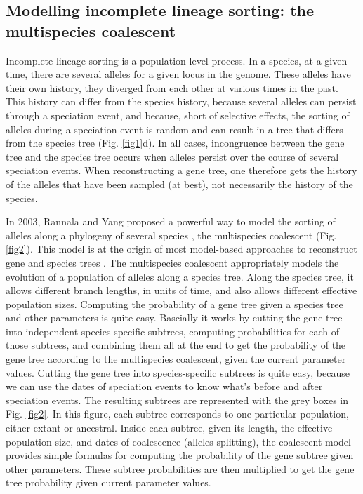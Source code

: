 \documentclass[11pt]{article}
\begin{document}
\subsection*{Modelling incomplete lineage sorting: the multispecies coalescent}
Incomplete lineage sorting is a population-level process.
In a species, at a given time, there are several alleles for a given locus in the genome.
These alleles have their own history, they diverged from each other at various times in the past.
This history can differ from the species history, because several alleles can persist through a speciation event, and because, short of selective effects, the sorting of alleles during a speciation event is random and can result in a tree that differs from the species tree (Fig. \ref{fig1}d).
In all cases, incongruence between the gene tree and the species tree occurs when alleles persist over the course of several speciation events.
When reconstructing a gene tree, one therefore gets the history of the alleles that have been sampled (at best), not necessarily the history of the species. 

In 2003, Rannala and Yang proposed a powerful way to model the sorting of alleles along a phylogeny of several species \citep{Rannal2003}, the multispecies coalescent (Fig. \ref{fig2}).
This model is at the origin of most model-based approaches to reconstruct gene and species trees \citep{Liu2007,}.
The multispecies coalescent appropriately models the evolution of a population of alleles along a species tree.
Along the species tree, it allows different branch lengths, in units of time, and also allows different effective population sizes.
Computing the probability of a gene tree given a species tree and other parameters is quite easy.
Bascially it works by cutting the gene tree into independent species-specific subtrees, computing probabilities for each of those subtrees, and combining them all at the end to get the probability of the gene tree according to the multispecies coalescent, given the current parameter values.
Cutting the gene tree into species-specific subtrees is quite easy, because we can use the dates of speciation events to know what's before and after speciation events. 
The resulting subtrees are represented with the grey boxes in Fig. \ref{fig2}.
In this figure, each subtree corresponds to one particular population, either extant or ancestral.
Inside each subtree, given its length, the effective population size, and dates of coalescence (alleles splitting), the coalescent model provides simple formulas for computing the probability of the gene subtree given other parameters.
These subtree probabilities are then multiplied to get the gene tree probability given current parameter values.
 
\end{document}
